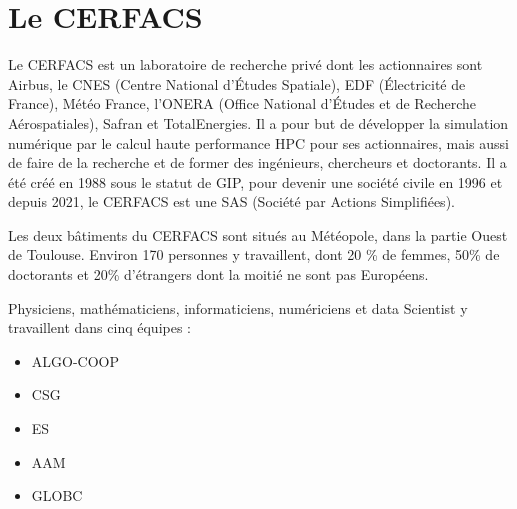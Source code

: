 \chapter{Le CERFACS}


Le CERFACS est un laboratoire de recherche privé dont les actionnaires sont Airbus, le CNES (Centre National d'Études Spatiale), EDF (Électricité de France), Météo France, l'ONERA (Office National d'Études et de Recherche Aérospatiales), Safran et TotalEnergies. Il a pour but de développer la simulation numérique par le calcul haute performance \ac{HPC} pour ses actionnaires, mais aussi de faire de la recherche et de former des ingénieurs, chercheurs et doctorants. Il a été créé en 1988 sous le statut de \ac{GIP}, pour devenir une société civile en 1996 et depuis 2021, le CERFACS est une SAS (Société par Actions Simplifiées).

\vspace{0,5cm}

Les deux bâtiments du CERFACS sont situés au Météopole, dans la partie Ouest de Toulouse. Environ 170 personnes y travaillent, dont 20 \% de femmes, 50\% de doctorants et 20\% d'étrangers dont la moitié ne sont pas Européens.

Physiciens, mathématiciens, informaticiens, numériciens et data Scientist y travaillent dans cinq équipes :


\begin{itemize}
    \item \ac{ALGO-COOP}
    \item \ac{CSG}
    \item \ac{ES}
    \item \ac{AAM}
    \item \ac{GLOBC}
\end{itemize}

